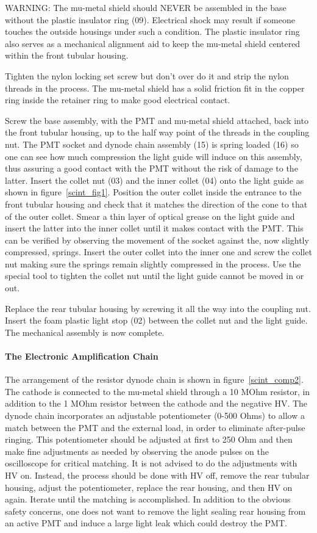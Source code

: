WARNING: The mu-metal shield should NEVER be assembled in the base without the 
plastic insulator ring (09). Electrical shock may result if someone touches the 
outside housings under such a condition. The plastic insulator ring also serves 
as a mechanical alignment aid to keep the mu-metal shield centered within the 
front tubular housing.

Tighten the nylon locking set screw but don't over do it and strip the nylon
threads in the process. The mu-metal shield has a solid friction fit in the
copper ring inside the retainer ring to make good electrical contact. 

Screw the base assembly, with the PMT and mu-metal shield attached, back into
the front tubular housing, up to the half way point of the threads in the
coupling nut. The PMT socket and dynode chain assembly (15) is spring loaded
(16) so one can see how much compression the light guide will induce on this
assembly, thus assuring a good contact with the PMT without the risk of damage
to the latter. Insert the collet nut (03) and the inner collet (04) onto the
light guide as shown in figure~\ref{scint_fig1}. Position the outer collet inside the entrance
to the front tubular housing and check that it matches the direction of the
cone to that of the outer collet. Smear a thin layer of optical grease on the
light guide and insert the latter into the inner collet until it makes contact
with the PMT. This can be verified by observing the movement of the socket
against the, now slightly compressed, springs. Insert the outer collet into the
inner one and screw the collet nut making sure the springs remain slightly
compressed in the process. Use the special tool to tighten the collet nut until
the light guide cannot be moved in or out. 

Replace the rear tubular housing by screwing it all the way into the coupling 
nut. Insert the foam plastic light stop (02) between the collet nut and the 
light guide. The mechanical assembly is now complete. 


\paragraph{The Electronic Amplification Chain}

   The arrangement of the resistor dynode chain is shown in figure~\ref{scint_comp2}. The 
cathode is connected to the mu-metal shield through a 10 MOhm resistor, in
addition to the 1 MOhm resistor between the cathode and the negative HV. The
dynode chain incorporates an adjustable potentiometer (0-500 Ohms) to allow a
match between the PMT and the external load, in order to eliminate after-pulse
ringing.  This potentiometer should be adjusted at first to 250 Ohm and then
make fine adjustments as needed by observing the anode pulses on the
oscilloscope for critical matching. It is not advised to do the adjustments
with HV on. Instead, the process should be done with HV off, remove the rear
tubular housing, adjust the potentiometer, replace the rear housing, and then
HV on again. Iterate until the matching is accomplished. In addition to the
obvious safety concerns, one does not want to remove the light sealing rear
housing from an active PMT and induce a large light leak which could destroy
the PMT. 


